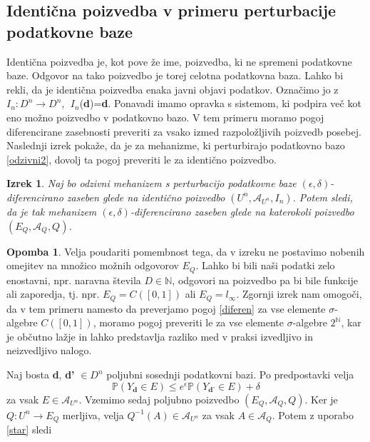 \documentclass[12pt,a4paper]{amsart}
\theoremstyle{definition} %
\newtheorem{opomba}[definicija]{Opomba}
\theoremstyle{plain} %
\newtheorem{izrek}[definicija]{Izrek}
\begin{document}
\subsection{Identična poizvedba v primeru perturbacije podatkovne baze}
Identična poizvedba je, kot pove že ime, poizvedba, ki ne spremeni podatkovne baze. Odgovor na tako poizvedbo je torej celotna podatkovna baza. Lahko bi rekli, da je identična poizvedba enaka javni objavi podatkov. Označimo jo z $ I_n : D^n \rightarrow D^n$, $\;I_n$(\textbf{d})=\textbf{d}. 
\newline
\newline
Ponavadi imamo opravka s sistemom, ki podpira več kot eno možno poizvedbo v podatkovno bazo. V tem primeru moramo pogoj diferencirane zasebnosti preveriti za vsako izmed razpoložljivih poizvedb posebej. Naslednji izrek pokaže, da je za mehanizme, ki perturbirajo podatkovno bazo \eqref{odzivni2}, dovolj ta pogoj preveriti le za identično poizvedbo.
\begin{izrek} 
Naj bo odzivni mehanizem s perturbacijo podatkovne baze  $(\epsilon , \delta)$-diferencirano zaseben glede na identično poizvedbo $(U^n, \mathcal{A}_{U^n}, I_n)$. Potem sledi, da je tak mehanizem $(\epsilon , \delta)$-diferencirano zaseben glede na katerokoli poizvedbo $(E_Q, \mathcal{A}_Q, Q)$.
\end{izrek}
\begin{opomba} Velja poudariti pomembnost tega, da v izreku ne postavimo nobenih omejitev na množico možnih odgovorov $E_Q$.  Lahko bi bili naši podatki zelo enostavni, npr. naravna števila $D \in \mathbb{N}$, odgovori na poizvedbo pa bi bile funkcije ali zaporedja, tj. npr. $E_Q = C([0,1])$ ali $E_Q = l_\infty$. Zgornji izrek nam omogoči, da v tem primeru namesto da preverjamo pogoj \eqref{diferen} za vse elemente $\sigma$-algebre $C([0,1])$, moramo pogoj preveriti le za vse elemente $\sigma$-algebre $2^{\mathbb{N}}$, kar je občutno lažje in lahko predstavlja razliko med v praksi izvedljivo in neizvedljivo nalogo.
\end{opomba}
\proof 
Naj bosta \textbf{d}, \textbf{d'} $\in D^n$ poljubni sosednji podatkovni bazi. Po predpostavki velja 
\begin{equation}\label{star}
\mathbb{P}(Y_{\textbf{d}} \in E) \leq e^\epsilon \mathbb{P}(Y_{\textbf{d'}} \in E) + \delta \tag {*}
\end{equation}
za vsak $E \in \mathcal{A}_{U^n}$. Vzemimo sedaj poljubno poizvedbo $(E_Q, \mathcal{A}_Q, Q)$. Ker je $Q: U^n \rightarrow E_Q$ merljiva, velja  $Q^{-1}(A)\in \mathcal{A}_{U^n}$ za vsak $A \in \mathcal{A}_Q$. Potem z uporabo \eqref{star} sledi 
\end{document}
